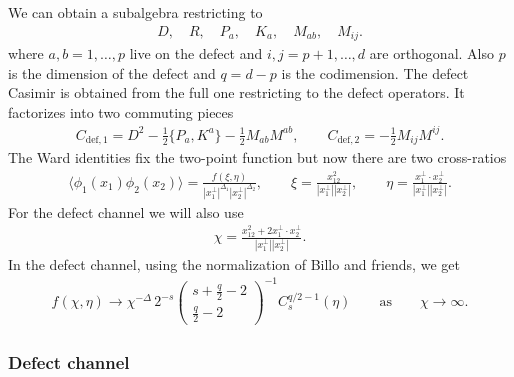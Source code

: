 \documentclass[letterpaper]{article}
\let\Oldsubsubsection\subsubsection
\renewcommand{\subsubsection}{\FloatBarrier\Oldsubsubsection}
\begin{document}
We can obtain a subalgebra restricting to
\begin{align}
 D, \quad
 R, \quad
 P_{a}, \quad
 K_{a}, \quad
 M_{ab}, \quad
 M_{ij}.
\end{align}
where $a,b = 1, \ldots, p$ live on the defect and $i,j= p+1, \ldots, d$ are orthogonal. Also $p$ is the dimension of the defect and $q  = d-p$ is the codimension.
The defect Casimir is obtained from the full one restricting to the defect operators.
It factorizes into two commuting pieces
\begin{align}
 C_{\text{def}, 1} = 
    D^2
  - \frac12 \{ P_{a}, K^{a} \}
  - \frac{1}{2} M_{ab} M^{ab}, \qquad
 C_{\text{def}, 2} 
  = - \frac{1}{2} M_{ij} M^{ij}.
\end{align}
The Ward identities fix the two-point function but now there are two cross-ratios
\begin{align}
 \langle \phi_1(x_1) \phi_2(x_2) \rangle
 = \frac{f(\xi, \eta)}{|x_1^\bot|^{\Delta_1} |x_2^\bot|^{\Delta_2}}, \qquad
 \xi = \frac{x_{12}^2}{|x_1^{\bot}| |x_2^{\bot}|}, \qquad
 \eta = \frac{x_{1}^\bot \cdot x_2^\bot}{|x_1^{\bot}| |x_2^{\bot}|}.
\end{align}
For the defect channel we will also use 
\begin{align}
 \chi = \frac{ x_{12}^2 + 2 x_1^\bot \cdot x_2^\bot}
             { |x_1^\bot| |x_2^\bot| } .
\end{align}
In the defect channel, using the normalization of Billo and friends, we get
\begin{align}
 f(\chi, \eta) 
 \to \chi^{-\Delta} \,
 2^{-s}
 \begin{pmatrix}
  s+ \frac{q}{2} -2 \\
  \frac{q}{2} -2
 \end{pmatrix}^{-1}
 C_{s}^{q/2-1}(\eta) 
 \qquad \text{as} \qquad
 \chi \to \infty.
\end{align}



\subsubsection{Defect channel}
\end{document}
